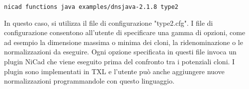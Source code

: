 \begin{center}
\verb|nicad functions java examples/dnsjava-2.1.8 type2|
\end{center}

In questo caso, si utilizza il file di configurazione "type2.cfg".
I file di configurazione consentono all'utente di specificare una gamma di opzioni, come ad esempio la dimensione massima o minima dei cloni, la ridenominazione o le normalizzazioni da eseguire. Ogni opzione specificata in questi file invoca un plugin NiCad che viene eseguito prima del confronto tra i potenziali cloni. I plugin sono implementati in TXL e l'utente può anche aggiungere nuove normalizzazioni programmandole con questo linguaggio.






